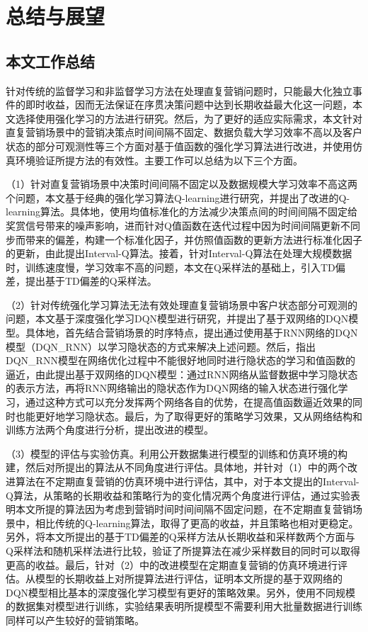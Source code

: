 \chapter{总结与展望}

\section{本文工作总结}
针对传统的监督学习和非监督学习方法在处理直复营销问题时，只能最大化独立事件的即时收益，因而无法保证在序贯决策问题中达到长期收益最大化这一问题，本文选择使用强化学习的方法进行研究。然后，为了更好的适应实际需求，本文针对直复营销场景中的营销决策点时间间隔不固定、数据负载大学习效率不高以及客户状态的部分可观测性等三个方面对基于值函数的强化学习算法进行改进，并使用仿真环境验证所提方法的有效性。主要工作可以总结为以下三个方面。

（1）针对直复营销场景中决策时间间隔不固定以及数据规模大学习效率不高这两个问题，本文基于经典的强化学习算法Q-learning进行研究，并提出了改进的Q-learning算法。具体地，使用均值标准化的方法减少决策点间的时间间隔不固定给奖赏信号带来的噪声影响，进而针对Q值函数在迭代过程中因为时间间隔更新不同步而带来的偏差，构建一个标准化因子，并仿照值函数的更新方法进行标准化因子的更新，由此提出Interval-Q算法。接着，针对Interval-Q算法在处理大规模数据时，训练速度慢，学习效率不高的问题，本文在Q采样法的基础上，引入TD偏差，提出基于TD偏差的Q采样法。

（2）针对传统强化学习算法无法有效处理直复营销场景中客户状态部分可观测的问题，本文基于深度强化学习DQN模型进行研究，并提出了基于双网络的DQN模型。具体地，首先结合营销场景的时序特点，提出通过使用基于RNN网络的DQN模型（DQN_RNN）以学习隐状态的方式来解决上述问题。然后，指出DQN_RNN模型在网络优化过程中不能很好地同时进行隐状态的学习和值函数的逼近，由此提出基于双网络的DQN模型：通过RNN网络从监督数据中学习隐状态的表示方法，再将RNN网络输出的隐状态作为DQN网络的输入状态进行强化学习，通过这种方式可以充分发挥两个网络各自的优势，在提高值函数逼近效果的同时也能更好地学习隐状态。最后，为了取得更好的策略学习效果，又从网络结构和训练方法两个角度进行分析，提出改进的模型。

（3）模型的评估与实验仿真。利用公开数据集进行模型的训练和仿真环境的构建，然后对所提出的算法从不同角度进行评估。具体地，并针对（1）中的两个改进算法在不定期直复营销的仿真环境中进行评估，其中，对于本文提出的Interval-Q算法，从策略的长期收益和策略行为的变化情况两个角度进行评估，通过实验表明本文所提的算法因为考虑到营销时间时间间隔不固定问题，在不定期直复营销场景中，相比传统的Q-learning算法，取得了更高的收益，并且策略也相对更稳定。另外，将本文所提出的基于TD偏差的Q采样方法从长期收益和采样数两个方面与Q采样法和随机采样法进行比较，验证了所提算法在减少采样数目的同时可以取得更高的收益。最后，针对（2）中的改进模型在定期直复营销的仿真环境进行评估。从模型的长期收益上对所提算法进行评估，证明本文所提的基于双网络的DQN模型相比基本的深度强化学习模型有更好的策略效果。另外，使用不同规模的数据集对模型进行训练，实验结果表明所提模型不需要利用大批量数据进行训练同样可以产生较好的营销策略。

